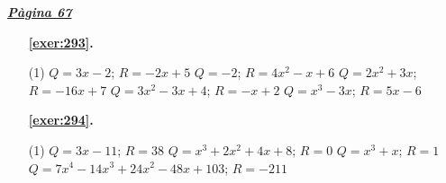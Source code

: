 
\hyperlink{page.67}{\textbf{\em Pàgina 67}}
\begin{enumerate}



 \item[\fontfamily{phv}\selectfont\color{blue}\textbf{\ref{exer:293}. }] \label{ans:293}
 \begin{tasks}[column-sep=1em, item-indent=1.3333em](1)
	 \task $Q=3x-2$; $R=-2x+5$
	 \task $Q=-2$; $R=4x^2-x+6$
	 \task $Q=2x^2+3x$; $R=-16x+7$
	 \task $Q=3x^2-3x+4$; $R=-x+2$
	 \task $Q=x^3-3x$; $R=5x-6$
\end{tasks}
 \end{enumerate}
\begin{enumerate}



 \item[\fontfamily{phv}\selectfont\color{blue}\textbf{\ref{exer:294}. }] \label{ans:294}
 \begin{tasks}[column-sep=1em, item-indent=1.3333em](1)
	 \task $Q=3x-11$; $R=38$
	 \task $Q=x^3+2x^2+4x+8$; $R=0$
	 \task $Q=x^3+x$; $R=1$
	 \task* $Q=7x^4-14x^3+24x^2-48x+103$; $R=-211$
\end{tasks}
 \end{enumerate}
\vspace{0.3cm}


